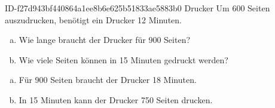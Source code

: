 \begin{exercise}
      {ID-f27d943bf440864a1ee8b6e625b51833ae5883b0}
      {Drucker}
  \ifproblem\problem
    Um \num{600} Seiten auszudrucken, benötigt ein Drucker \num{12} Minuten.
    \begin{enumerate}[a)]
      \item Wie lange braucht der Drucker für \num{900} Seiten?
      \item Wie viele Seiten können in \num{15} Minuten gedruckt werden?
    \end{enumerate}
  \fi
  \ifoutcome\outcome
    \begin{enumerate}[a)]
      \item Für \num{900} Seiten braucht der Drucker \num{18} Minuten.
      \item In \num{15} Minuten kann der Drucker \num{750} Seiten drucken.
    \end{enumerate}
  \fi
\end{exercise}
